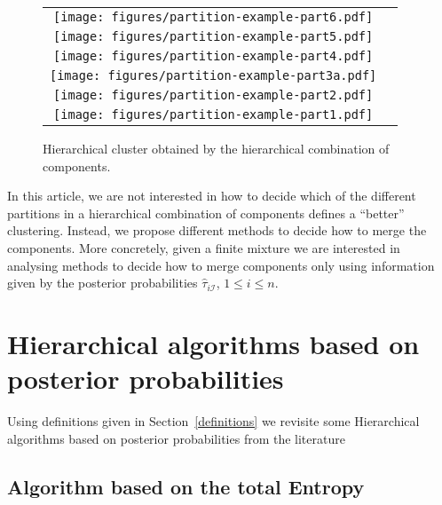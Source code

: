 \documentclass[10pt, a4paper]{article}
\begin{document}
\begin{figure}[thbp]
\begin{center}
\begin{tabular}{cc}
  \texttt{[image: figures/partition-example-part6.pdf]} \\
    \texttt{[image: figures/partition-example-part5.pdf]} \\
      \texttt{[image: figures/partition-example-part4.pdf]} \\
        \texttt{[image: figures/partition-example-part3a.pdf]} \\
          \texttt{[image: figures/partition-example-part2.pdf]} \\
            \texttt{[image: figures/partition-example-part1.pdf]}
 \end{tabular}
 \caption{Hierarchical cluster obtained by the hierarchical combination of components.}\label{hierarchical}
\end{center}
\end{figure}

In this article, we are not interested in how to decide which of the different partitions in a hierarchical combination of components defines a ``better'' clustering. Instead, we propose different methods to decide how to merge the components. More concretely, given a finite mixture we are interested in analysing methods to decide how to merge components only using information given by the posterior probabilities $\hat{\tau}_{i \mathcal{I}}$, $1\leq i \leq n$.


\section{Hierarchical algorithms based on posterior probabilities}

Using definitions given in Section~\ref{definitions} we revisite some Hierarchical algorithms based on posterior probabilities from the literature

\subsection*{Algorithm based on the total Entropy}

\end{document}
